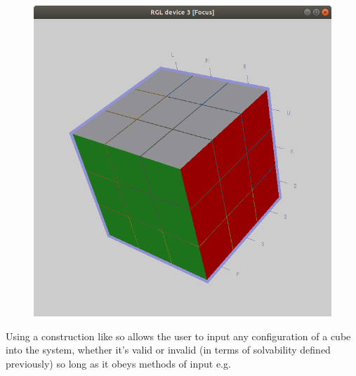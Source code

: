\documentclass{article}
\begin{document}
\begin{figure}[h]
    \includegraphics[scale=.4]{3dcube.png}
\end{figure}
\newpage
Using a construction like so allows the user to input any configuration of a cube into the system, whether it's valid or invalid (in terms of solvability defined previously) so long as it obeys methods of input e.g.
\end{document}
